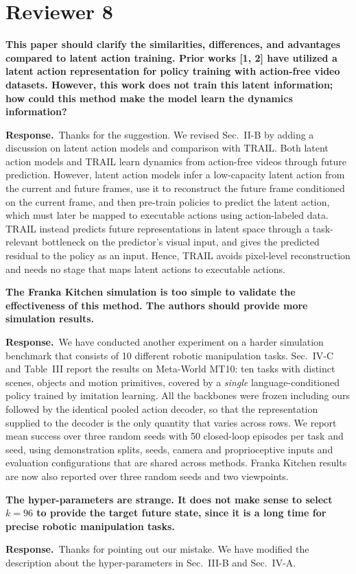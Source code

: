\documentclass[11pt,a4paper]{article}
\newcommand{\C}[1]{\textbf{#1}\par\vspace{2pt}}
\newcommand{\R}[1]{\textbf{Response.}~#1}
\begin{document}
\section{Reviewer 8}

\begin{qa}

\item \C{This paper should clarify the similarities, differences, and advantages compared to
latent action training. Prior works [1, 2] have utilized a latent action representation for policy
training with action-free video datasets. However, this work does not train this latent
information; how could this method make the model learn the dynamics information?}

\R{Thanks for the suggestion. We revised Sec.~II-B by adding a discussion on latent action models and comparison with TRAIL. Both latent action models and TRAIL learn dynamics from action-free videos through future prediction. However, latent action models infer a low-capacity latent action from the current and future frames, use it to reconstruct the future frame conditioned on the current frame, and then pre-train policies to predict the latent action, which must later be mapped to executable actions using action-labeled data. TRAIL instead predicts future representations in latent space through a task-relevant bottleneck on the predictor's visual input, and gives the predicted residual to the policy as an input. Hence, TRAIL avoids pixel-level reconstruction and needs no stage that maps latent actions to executable actions.}

\item \C{The Franka Kitchen simulation is too simple to validate the effectiveness of this method.
The authors should provide more simulation results.}
\R{We have conducted another experiment on a harder simulation benchmark that consists of 10 different robotic manipulation tasks. Sec.~IV-C
and Table~III report the results on Meta-World MT10: ten tasks with distinct scenes, objects and motion primitives, covered by a \emph{single} language-conditioned policy trained by imitation learning. All the backbones were frozen including ours followed by the identical pooled action decoder, so that the representation supplied to the decoder is the only quantity that varies across rows. We report mean success over three random seeds with 50 closed-loop episodes per task and seed, using demonstration splits, seeds, camera and proprioceptive inputs and evaluation configurations that are shared across
methods. Franka Kitchen results are now also reported over three random seeds and two viewpoints.

}

\item \C{The hyper-parameters are strange. It does not make sense to select $k=96$ to provide the target future state, since it is a long time for precise robotic manipulation tasks.}

\R{Thanks for pointing out our mistake. We have modified the description about the hyper-parameters in Sec.~III-B and Sec.~IV-A.}

\end{qa}
\end{document}
